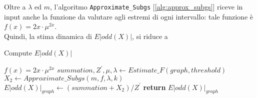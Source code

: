 Oltre a $\lambda$ ed $m$, l'algoritmo \texttt{Approximate\_Subgs} [\ref{alg:approx_subgs}] riceve in input anche la funzione da valutare agli estremi di ogni intervallo: tale funzione è $f(x) = 2x\cdot\mu^{2x}$.\\
Quindi, la stima dinamica di $E|odd(X)|$, si riduce a
\begin{algorithm}
	\caption{Compute $E|odd(X)|$}
	\label{alg:eoddx}
	\begin{algorithmic}[1]
		\State $f(x) = 2x\cdot\mu^{2x}$
		\State $summation, Z^{\prime}, \mu, \lambda \gets Estimate\_F(graph, threshold)$
		\State $X_2 \gets Approximate\_Subgs(m, f, \lambda, k)$
		\State $E|odd(X)|_{graph} \gets (summation + X_2) / Z^{\prime}$
		\State \textbf{return} $E|odd(X)|_{graph}$
		\EndProcedure
	\end{algorithmic}
\end{algorithm}
